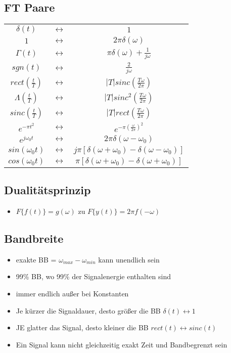 \documentclass{article}
\begin{document}
\subsection{FT Paare}
\begin{tabular}{ ccc}
$\delta(t)$ & $\leftrightarrow$ & $1$\\
$1$ & $\leftrightarrow$ & $2\pi\delta(\omega)$\\
$\Gamma(t)$ & $\leftrightarrow$ & $\pi\delta(\omega)+\frac{1}{j\omega}$\\
$sgn(t)$ & $\leftrightarrow$ & $\frac{2}{j\omega}$\\
$rect(\frac{t}{T})$ & $\leftrightarrow$ & $|T|sinc(\frac{T\omega}{2\pi})$\\
$\Lambda(\frac{t}{T})$ & $\leftrightarrow$ & $|T|sinc^2(\frac{T\omega}{2\pi})$\\
$sinc(\frac{t}{T})$ & $\leftrightarrow$ & $|T|rect(\frac{T\omega}{2\pi})$\\
$e^{-\pi t^2}$ & $\leftrightarrow$ & $e^{-\pi(\frac{\omega}{2\pi})^2}$\\
$e^{j\omega_0t}$ & $\leftrightarrow$ & $2\pi\delta(\omega-\omega_0)$\\
$sin(\omega_0 t)$ & $\leftrightarrow$ & $j\pi[\delta(\omega+\omega_0)-\delta(\omega-\omega_0)]$\\
$cos(\omega_0t)$ & $\leftrightarrow$ & $\pi[\delta(\omega+\omega_0)-\delta(\omega+\omega_0)]$\\

\end{tabular}

\subsection{Dualitätsprinzip}
\begin{itemize}
\item $F\{f(t)\} = g(\omega)$ zu $F\{y(t)\} = 2\pi f(-\omega)$
\end{itemize}

\subsection{Bandbreite}
\begin{itemize}
\item exakte BB = $\omega_{max}-\omega_{min}$ kann unendlich sein
\item 99\% BB, wo 99\% der Signalenergie enthalten sind
\item immer endlich au\ss er bei Konstanten
\item Je kürzer die Signaldauer, desto grö\ss er die BB $\delta(t) \leftrightarrow 1$
\item JE glatter das Signal, desto kleiner die BB $rect(t) \leftrightarrow sinc(t)$
\item Ein Signal kann nicht gleichzeitig exakt Zeit und Bandbegrenzt sein
\end{itemize}
\end{document}
